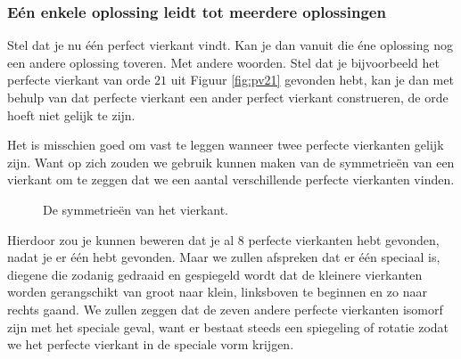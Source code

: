 \subsubsection{E\'en enkele oplossing leidt tot meerdere oplossingen}

Stel dat je nu \'e\'en perfect vierkant vindt. Kan je dan vanuit die \'ene oplossing nog een andere oplossing toveren. Met andere woorden. Stel dat je bijvoorbeeld het perfecte vierkant van orde $21$ uit Figuur \ref{fig:pv21} gevonden hebt, kan je dan met behulp van dat perfecte vierkant een ander perfect vierkant construeren, de orde hoeft niet gelijk te zijn.

Het is misschien goed om vast te leggen wanneer twee perfecte vierkanten gelijk zijn. Want op zich zouden we gebruik kunnen maken van de symmetrie\"en van een vierkant om te zeggen dat we een aantal verschillende perfecte vierkanten vinden.


\begin{figure}[ht]
  \centering
  



  \caption{De symmetrie\"en van het vierkant.}
  \label{fig:symmetrie_vierkant}
\end{figure}


\clearpage

Hierdoor zou je kunnen beweren dat je al $8$ perfecte vierkanten hebt gevonden, nadat je er \'e\'en hebt gevonden. Maar we zullen afspreken dat er \'e\'en speciaal is, diegene die zodanig gedraaid en gespiegeld wordt dat de kleinere vierkanten worden gerangschikt van groot naar klein, linksboven te beginnen en zo naar rechts gaand. We zullen zeggen dat de zeven andere perfecte vierkanten isomorf zijn met het speciale geval, want er bestaat steeds een spiegeling of rotatie zodat we het perfecte vierkant in de speciale vorm krijgen.

